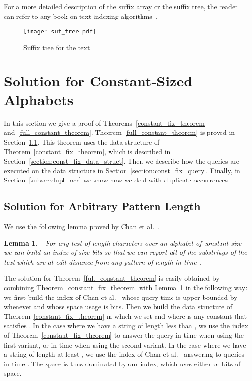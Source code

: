 \documentclass{article}
\newcommand{\?}{\mskip1.5mu}
\newtheorem{lemma}{Lemma}
\begin{document}
For a more detailed description of the suffix array or the suffix tree, the reader can refer to any book on text indexing algorithms~\cite{Gu97,CR03}.
\begin{figure}[htb] 
\centering\texttt{[image: suf\_tree.pdf]} 
\caption{Suffix tree for the text } \label{pic:suf_tree} \end{figure}


\section{Solution for Constant-Sized Alphabets}
\label{section:const_alpha}
In this section we give a proof of Theorems~\ref{constant_fix_theorem} and~\ref{full_constant_theorem}. 
Theorem~\ref{full_constant_theorem} is proved in Section~\ref{section:arb_const_query}. This theorem uses the data structure of Theorem~\ref{constant_fix_theorem}, which is described in Section~\ref{section:const_fix_data_struct}. Then  we describe how the queries are executed on the data structure in Section~\ref{section:const_fix_query}. Finally, in Section~\ref{subsec:dupl_occ} we show how we deal with duplicate occurrences. 
\subsection{Solution for Arbitrary Pattern Length}
\label{section:arb_const_query}
We use the following lemma proved by Chan et al.~\cite[Section 3.2]{chan2011linear}.
\begin{lemma}~\cite[Section 3.2]{chan2011linear}
\label{CLSTW06b0_fix_lemma}
For any text  of length  characters over an alphabet of constant-size we can build an index of size  bits so that we can report all of the  substrings of the text which are at edit distance  from any pattern  of length  in time . 
\end{lemma}

The solution for Theorem~\ref{full_constant_theorem} is easily obtained by combining Theorem~\ref{constant_fix_theorem} with Lemma~\ref{CLSTW06b0_fix_lemma} in the following way: we first build the index of Chan et al.~\cite{chan2011linear} whose query time is upper bounded by  whenever  and whose space usage is  bits. Then we build the data structure of Theorem~\ref{constant_fix_theorem} in which we set  and  where  is any constant that satisfies . In the case where we have a string of length less than , we use the index of Theorem~\ref{constant_fix_theorem} to answer the query in time  when using the first variant, or in time  when using the second variant. In the case where we have a string of length at least , we use the index of Chan et al.~\cite{chan2011linear} answering to queries in time . The space is thus dominated by our index, which uses either  or  bits of space. 
\end{document}
